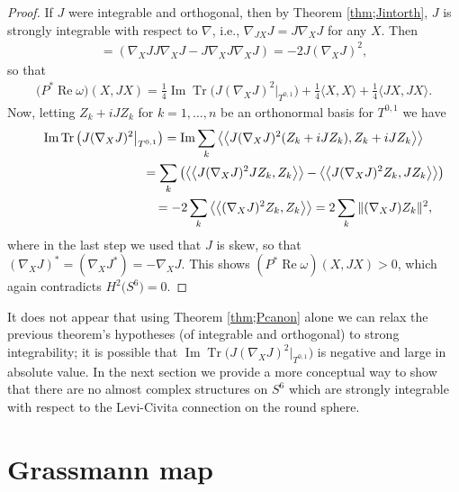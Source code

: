 \documentclass[10pt,a4paper]{amsart}
\DeclareMathOperator{\Tr}{Tr}
\numberwithin{equation}{section}
\begin{document}
\begin{proof}
If $J$ were integrable and orthogonal, then by Theorem \ref{thm;Jintorth}, $J$ is strongly integrable with respect to $\nabla$, i.e., $\nabla_{JX} J = J \nabla_X J$
for any $X$. Then
\begin{gather*}
 [\nabla_X J, \nabla_{JX} J] = ( \nabla_X J J \nabla_{X} J - J \nabla_X J \nabla_{X} J )=-2 J ( \nabla_X J )^2,
\end{gather*}
so that
\begin{gather*}
\big( P^*\operatorname{Re} \omega\big)(X,JX) = \frac{1}{4} \operatorname{Im} \Tr\big( J ( \nabla_X J )^2 \big|_{T^{0,1}} \big) + \frac 1 4 \langle X,X\rangle + \frac 1 4 \langle JX,JX \rangle .
\end{gather*}
Now, letting $Z_k +iJZ_k$ for $k= 1, \ldots , n$ be an orthonormal basis for $T^{0,1}$ we have
\begin{gather*}
\operatorname{Im} \Tr\big( J ( \nabla_X J )^2 \big|_{T^{0,1}} \big) = \operatorname{Im} \sum_k \big\langle\big\langle J ( \nabla_X J )^2 (Z_k +iJZ_k), Z_k +iJZ_k \big\rangle\big\rangle \\
\hphantom{\operatorname{Im} \Tr\big( J ( \nabla_X J )^2 \big|_{T^{0,1}} \big)}{} =
\sum_k \big( \big\langle\big\langle J (\nabla_X J)^2 JZ_k, Z_k \big\rangle\big\rangle -
 \big\langle\big\langle J (\nabla_X J)^2 Z_k , JZ_k \big\rangle\big\rangle \big) \\
\hphantom{\operatorname{Im} \Tr\big( J ( \nabla_X J )^2 \big|_{T^{0,1}} \big)}{}
 = -2 \sum_k \big\langle\big\langle (\nabla_X J)^2 Z_k, Z_k \big\rangle\big\rangle = 2 \sum_k \| (\nabla_X J) Z_k \|^2,
\end{gather*}
where in the last step we used that $J$ is skew, so that $(\nabla_X J)^* = ( \nabla_X J^* ) = - \nabla_X J $. This shows $(P^* \operatorname{Re} \omega)(X,JX) > 0$, which again contradicts $H^2\big(S^6\big) = 0$.
\end{proof}

It does not appear that using Theorem \ref{thm;Pcanon} alone we can relax the previous theorem's hypotheses (of integrable and orthogonal)
to strong integrability; it is possible that $\operatorname{Im} \Tr\big( J ( \nabla_X J )^2 \big|_{T^{0,1}} \big)$ is negative and large in absolute value. In the next section we provide a more conceptual way to show that there are no almost complex structures on $S^6$ which are strongly integrable with respect to the Levi-Civita connection on the round sphere.

\section{Grassmann map} \label{sec;Gmap}
\end{document}
